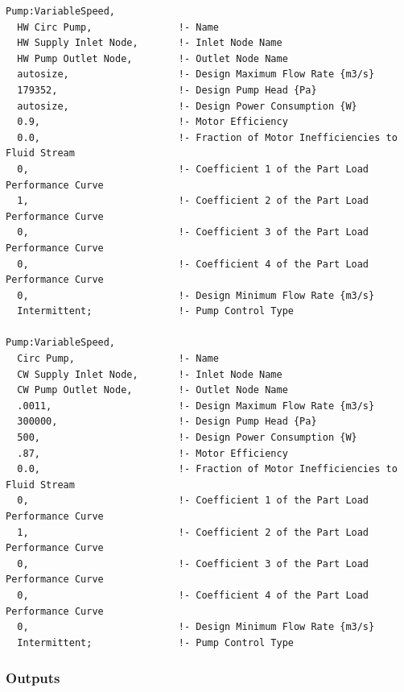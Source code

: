 \begin{lstlisting}
Pump:VariableSpeed,
  HW Circ Pump,               !- Name
  HW Supply Inlet Node,       !- Inlet Node Name
  HW Pump Outlet Node,        !- Outlet Node Name
  autosize,                   !- Design Maximum Flow Rate {m3/s}
  179352,                     !- Design Pump Head {Pa}
  autosize,                   !- Design Power Consumption {W}
  0.9,                        !- Motor Efficiency
  0.0,                        !- Fraction of Motor Inefficiencies to Fluid Stream
  0,                          !- Coefficient 1 of the Part Load Performance Curve
  1,                          !- Coefficient 2 of the Part Load Performance Curve
  0,                          !- Coefficient 3 of the Part Load Performance Curve
  0,                          !- Coefficient 4 of the Part Load Performance Curve
  0,                          !- Design Minimum Flow Rate {m3/s}
  Intermittent;               !- Pump Control Type

Pump:VariableSpeed,
  Circ Pump,                  !- Name
  CW Supply Inlet Node,       !- Inlet Node Name
  CW Pump Outlet Node,        !- Outlet Node Name
  .0011,                      !- Design Maximum Flow Rate {m3/s}
  300000,                     !- Design Pump Head {Pa}
  500,                        !- Design Power Consumption {W}
  .87,                        !- Motor Efficiency
  0.0,                        !- Fraction of Motor Inefficiencies to Fluid Stream
  0,                          !- Coefficient 1 of the Part Load Performance Curve
  1,                          !- Coefficient 2 of the Part Load Performance Curve
  0,                          !- Coefficient 3 of the Part Load Performance Curve
  0,                          !- Coefficient 4 of the Part Load Performance Curve
  0,                          !- Design Minimum Flow Rate {m3/s}
  Intermittent;               !- Pump Control Type
\end{lstlisting}

\subsubsection{Outputs}\label{outputs-026}

